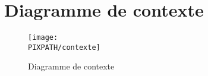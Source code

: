 \section{Diagramme de contexte}


\begin{center}
\begin{figure}
\texttt{[image: \\PIXPATH/contexte]}
\label{sg}
\caption{Diagramme de contexte}
\end{figure}
\end{center}

\vfill
\pagebreak
